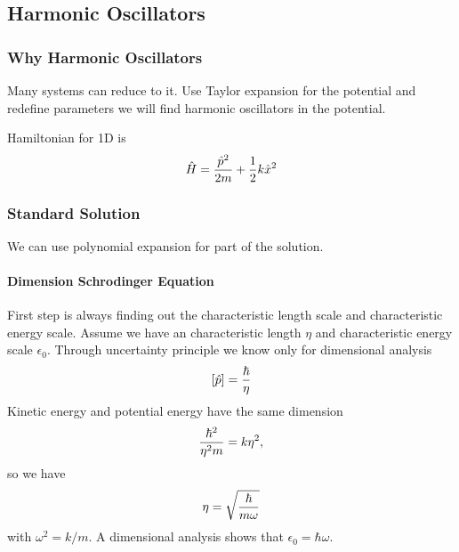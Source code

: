 \documentclass[letterpaper,10pt,english]{sphinxmanual}
\begin{document}
\subsection{Harmonic Oscillators}
\label{Quantum/QuantumMechanics:harmonic-oscillators}

\subsubsection{Why Harmonic Oscillators}
\label{Quantum/QuantumMechanics:why-harmonic-oscillators}
Many systems can reduce to it. Use Taylor expansion for the potential and redefine parameters we will find harmonic oscillators in the potential.

Hamiltonian for 1D is
\begin{gather}
\begin{split}\hat H = \frac{\hat p^2}{2m} + \frac{1}{2} k \hat x^2\end{split}\notag
\end{gather}

\subsubsection{Standard Solution}
\label{Quantum/QuantumMechanics:standard-solution}
We can use polynomial expansion for part of the solution.


\paragraph{Dimension Schrodinger Equation}
\label{Quantum/QuantumMechanics:dimension-schrodinger-equation}
First step is always finding out the characteristic length scale and characteristic energy scale. Assume we have an characteristic length \(\eta\) and characteristic energy scale \(\epsilon_0\). Through uncertainty principle we know only for dimensional analysis
\begin{gather}
\begin{split}\left[\hat p\right]=\frac{\hbar}{\eta}\end{split}\notag
\end{gather}
Kinetic energy and potential energy have the same dimension
\begin{gather}
\begin{split}\frac{\hbar^2}{\eta^2 m}=k \eta^2 ,\end{split}\notag
\end{gather}
so we have
\begin{gather}
\begin{split}\eta = \sqrt{\frac{\hbar}{m\omega}}\end{split}\notag
\end{gather}
with \(\omega^2=k/m\). A dimensional analysis shows that \(\epsilon_0=\hbar\omega\).
\end{document}
